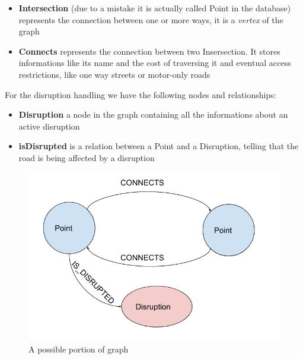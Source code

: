 \begin{itemize}
	\item \textbf{Intersection }(due to a mistake it is actually called Point in the database) represents the connection between one or more ways, it is a \textit{vertex} of the graph
	\item \textbf{Connects} represents the connection between two Insersection. It stores informations like its name and the cost of traversing it and eventual access restrictions, like one way streets or motor-only roads
	
\end{itemize}

For the disruption handling we have the following nodes and relationships:

\begin{itemize}
	\item \textbf{Disruption} a node in the graph containing all the informations about an active disruption
	\item \textbf{isDisrupted} is a relation between a Point and a Disruption, telling that the road is being affected by a disruption

\end{itemize}
	
\begin{figure}[H]
	\centering
	\includegraphics[width=0.7\linewidth]{assets/schemaneo4j}
	\caption{A possible portion of graph}
	\label{fig:schemaneo4j}
\end{figure}

